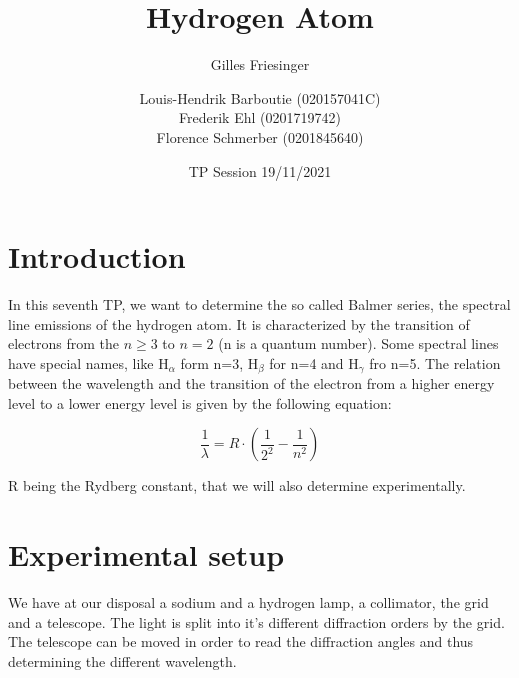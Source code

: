 \documentclass{scrartcl}
\title{Hydrogen Atom}
\subtitle{Gilles Friesinger}
\date{TP Session 19/11/2021}
\author{Louis-Hendrik Barboutie (020157041C)\\ Frederik Ehl (0201719742) \\ Florence Schmerber (0201845640)}
\begin{document}
\maketitle

\clearpage

\tableofcontents

\listoffigures
	
\clearpage

\section{Introduction}

In this seventh TP, we want to determine the so called Balmer series, the spectral line emissions of the hydrogen atom. It is characterized by the transition of electrons from the $n\geq3$ to $n=2$ (n is a quantum number). Some spectral lines have special names, like H$_{\alpha}$ form n=3, H$_{\beta}$ for n=4 and H$_{\gamma}$ fro n=5. The relation between the wavelength and the transition of the electron from a higher energy level to a lower energy level is given by the following equation:

\begin{equation}
   \frac{1}{\lambda}=R \cdot (\frac{1}{2^2}-\frac{1}{n^2}) \nonumber
\end{equation}

R being the Rydberg constant, that we will also determine experimentally.
\section{Experimental setup}

We have at our disposal a sodium and a hydrogen lamp, a collimator, the grid and a telescope. 
The light is split into it's different diffraction orders by the grid. The telescope can be moved in order to read the diffraction angles and thus determining the different wavelength.
\end{document}
